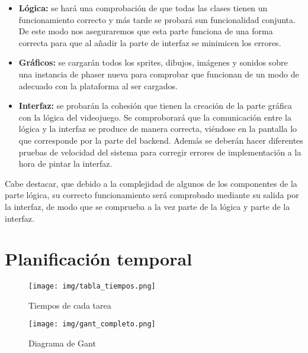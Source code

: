 \documentclass[palatino]{apuntes}
\begin{document}
\begin{itemize}
    \item \textbf{Lógica:} se hará una comprobación de que todas las clases tienen un funcionamiento correcto y más tarde se probará sun funcionalidad conjunta. De este modo nos aseguraremos que esta parte funciona de una forma correcta para que al añadir la parte de interfaz se minimicen los errores.
    \item \textbf{Gráficos:} se cargarán todos los sprites, dibujos, imágenes y sonidos sobre una instancia de phaser nueva para comprobar que funcionan de un modo de adecuado con la plataforma al ser cargados.
    \item \textbf{Interfaz:} se probarán la cohesión que tienen la creación de la parte gráfica con la lógica del videojuego. Se comproborará que la comunicación entre la lógica y la interfaz se produce de manera correcta, viéndose en la pantalla lo que corresponde por la parte del backend. Además se deberán hacer diferentes pruebas de velocidad del sistema para corregir errores de implementación a la hora de pintar la interfaz.
\end{itemize}

Cabe destacar, que debido a la complejidad de algunos de los componentes de la parte lógica, su correcto funcionamiento será comprobado mediante su salida por la interfaz, de modo que se comprueba a la vez parte de la lógica y parte de la interfaz.


\newpage
\appendix
\chapter{Planificación temporal}

\begin{figure}[hbtp]
    \centering
    \texttt{[image: img/tabla\_tiempos.png]}
    \caption{Tiempos de cada tarea}
    \label{fig:tiempostarea}
\end{figure}

\newpage

\begin{figure}[hbtp]
    \centering
    \texttt{[image: img/gant\_completo.png]}
    \caption{Diagrama de Gant}
    \label{fig:diagramagant}
\end{figure}
\end{document}
